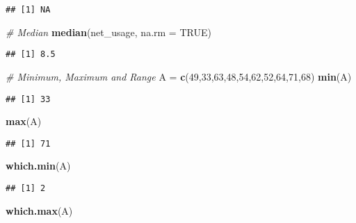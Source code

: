 \documentclass[
]{article}
\newenvironment{Shaded}{\begin{snugshade}}{\end{snugshade}}
\newcommand{\AttributeTok}[1]{\textcolor[rgb]{0.13,0.29,0.53}{#1}}
\newcommand{\CommentTok}[1]{\textcolor[rgb]{0.56,0.35,0.01}{\textit{#1}}}
\newcommand{\ConstantTok}[1]{\textcolor[rgb]{0.56,0.35,0.01}{#1}}
\newcommand{\DecValTok}[1]{\textcolor[rgb]{0.00,0.00,0.81}{#1}}
\newcommand{\FunctionTok}[1]{\textcolor[rgb]{0.13,0.29,0.53}{\textbf{#1}}}
\newcommand{\NormalTok}[1]{#1}
\newcommand{\OtherTok}[1]{\textcolor[rgb]{0.56,0.35,0.01}{#1}}
\begin{document}
\begin{verbatim}
## [1] NA
\end{verbatim}

\begin{Shaded}
\begin{Highlighting}[]
\CommentTok{\# Median}
\FunctionTok{median}\NormalTok{(net\_usage, }\AttributeTok{na.rm =} \ConstantTok{TRUE}\NormalTok{)}
\end{Highlighting}
\end{Shaded}

\begin{verbatim}
## [1] 8.5
\end{verbatim}

\begin{Shaded}
\begin{Highlighting}[]
\CommentTok{\# Minimum, Maximum and Range}
\NormalTok{A }\OtherTok{=} \FunctionTok{c}\NormalTok{(}\DecValTok{49}\NormalTok{,}\DecValTok{33}\NormalTok{,}\DecValTok{63}\NormalTok{,}\DecValTok{48}\NormalTok{,}\DecValTok{54}\NormalTok{,}\DecValTok{62}\NormalTok{,}\DecValTok{52}\NormalTok{,}\DecValTok{64}\NormalTok{,}\DecValTok{71}\NormalTok{,}\DecValTok{68}\NormalTok{)}
\FunctionTok{min}\NormalTok{(A)}
\end{Highlighting}
\end{Shaded}

\begin{verbatim}
## [1] 33
\end{verbatim}

\begin{Shaded}
\begin{Highlighting}[]
\FunctionTok{max}\NormalTok{(A)}
\end{Highlighting}
\end{Shaded}

\begin{verbatim}
## [1] 71
\end{verbatim}

\begin{Shaded}
\begin{Highlighting}[]
\FunctionTok{which.min}\NormalTok{(A)}
\end{Highlighting}
\end{Shaded}

\begin{verbatim}
## [1] 2
\end{verbatim}

\begin{Shaded}
\begin{Highlighting}[]
\FunctionTok{which.max}\NormalTok{(A)}
\end{Highlighting}
\end{Shaded}
\end{document}

